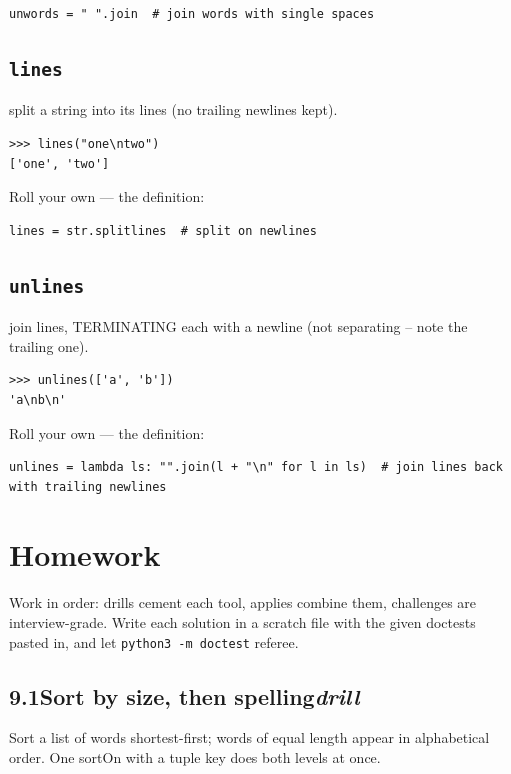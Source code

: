 \documentclass[10pt,letterpaper]{book}
\begin{document}
\begin{lstlisting}[style=ex]
unwords = " ".join  # join words with single spaces
\end{lstlisting}
\subsection{\texttt{lines}}\label{def:lines}
split a string into its lines (no trailing newlines kept).
\begin{lstlisting}[style=ex]
>>> lines("one\ntwo")
['one', 'two']
\end{lstlisting}

Roll your own --- the definition:

\begin{lstlisting}[style=ex]
lines = str.splitlines  # split on newlines
\end{lstlisting}

\subsection{\texttt{unlines}}\label{def:unlines}
join lines, TERMINATING each with a newline (not separating -- note the trailing one).
\begin{lstlisting}[style=ex]
>>> unlines(['a', 'b'])
'a\nb\n'
\end{lstlisting}

Roll your own --- the definition:

\begin{lstlisting}[style=ex]
unlines = lambda ls: "".join(l + "\n" for l in ls)  # join lines back with trailing newlines
\end{lstlisting}
\section{Homework}
Work in order: drills cement each tool, applies combine them,
challenges are interview-grade. Write each solution in a scratch file with
the given doctests pasted in, and let \texttt{python3 -m doctest} referee.
\subsection*{9.1\quad Sort by size, then spelling\hfill\textnormal{\textit{drill}}}
Sort a list of words shortest-first; words of equal length appear in alphabetical order. One sortOn with a tuple key does both levels at once.
\end{document}
